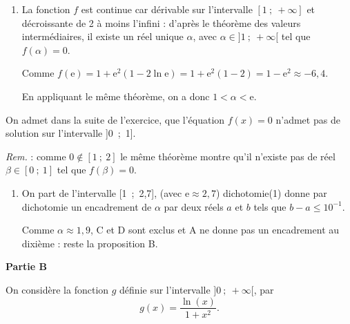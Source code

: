 \documentclass[10pt]{article}
\providecommand{\e}{{\mathrm{e}}}
\begin{document}
\begin{enumerate}
\item 
La fonction $f$ est continue car dérivable sur l'intervalle $[1~;~+ \infty]$ et décroissante de 2 à moins l'infini : d'après le théorème des valeurs intermédiaires, il existe un réel unique $\alpha$, avec $\alpha \in ]1~;~+ \infty[$ tel que $f(\alpha) = 0$.

Comme $f(\e) = 1 + \e^2(1 - 2\ln \e) = 1 + \e^2(1 - 2) = 1 - \e^2 \approx - 6,4$.

En appliquant le même théorème, on a donc $1 < \alpha < \e$.
\end{enumerate}

On admet dans la suite de l'exercice, que l'équation $f(x) = 0$ n'admet pas de solution sur l'intervalle ]0~;~1].

\emph{Rem. } : comme $0 \notin [1~;~2]$ le même théorème montre qu'il n'existe pas de réel $\beta \in [0~;~1]$ tel que $f(\beta) = 0$.

\begin{enumerate}[resume]
\item 










































On part de l'intervalle [1~;~2,7], (avec $\e \approx 2,7$)
{\ttfamily dichotomie(1)} donne par dichotomie un encadrement de $\alpha$ par deux réels $a$ et $b$ tels que $b - a \leqslant 10^{-1}$.

Comme $\alpha \approx 1,9$, C et D sont exclus et A ne donne pas un encadrement au dixième : reste la proposition B.
\end{enumerate}

\bigskip

\textbf{Partie B}

\medskip

On considère la fonction $g$ définie sur l'intervalle $]0~;~+ \infty[$, par 
\[g(x) = \dfrac{\ln (x)}{1 + x^2}.\]
\end{document}
